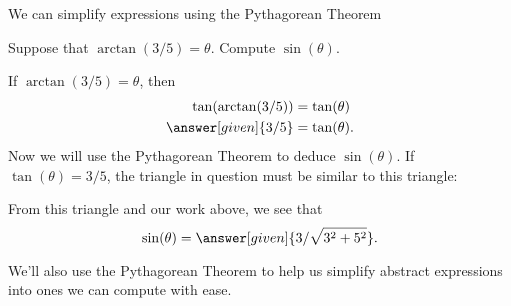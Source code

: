 \documentclass{ximera}
\begin{document}
We can simplify expressions using the Pythagorean Theorem

\begin{example}
  Suppose that $\arctan(3/5) = \theta$. Compute $\sin(\theta)$.
  \begin{explanation}
    If $\arctan(3/5) = \theta$, then
    \begin{align*}
    \tan(\arctan(3/5)) &= \tan(\theta)\\
    \answer[given]{3/5} &= \tan(\theta).
    \end{align*}
    Now we will use the Pythagorean Theorem to deduce
    $\sin(\theta)$. If $\tan(\theta)=3/5$, the triangle in question must
    be similar to this triangle:
    \begin{image}
    \end{image}
    From this triangle and our work above, we see that
    \[
    \sin(\theta) = \answer[given]{3/\sqrt{3^2+5^2}}.
    \]
  \end{explanation}
\end{example}



We'll also use the Pythagorean Theorem to help us simplify abstract
expressions into ones we can compute with ease.
\end{document}

